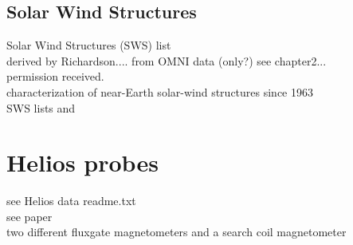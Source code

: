 \subsection{Solar Wind Structures}
Solar Wind Structures (SWS) list\\
derived by Richardson.... from OMNI data (only?)
see chapter2...\\

permission received.\\

characterization of near-Earth solar-wind structures since 1963\\
SWS lists \citep{Richardson2000} and \citep{Richardson2012}


\section{Helios probes}
\label{sec:helios_probes}

see Helios data readme.txt\\
see paper\\

two different fluxgate magnetometers and a search coil magnetometer\\

